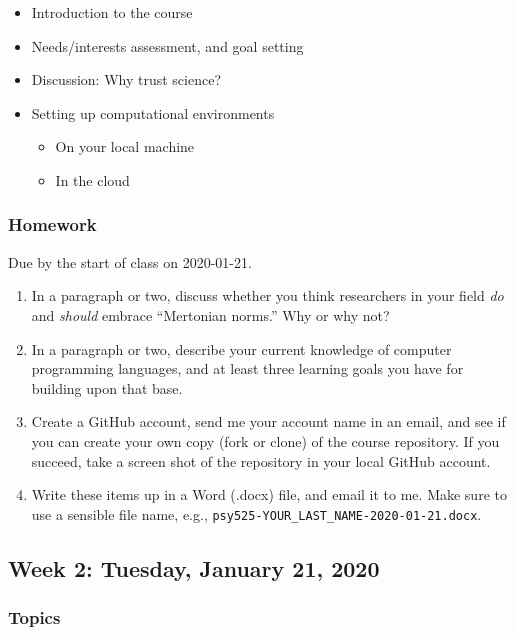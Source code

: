 \documentclass[
]{article}
\providecommand{\tightlist}{%
  \setlength{\itemsep}{0pt}\setlength{\parskip}{0pt}}
\begin{document}
\begin{itemize}
\tightlist
\item
  Introduction to the course
\item
  Needs/interests assessment, and goal setting
\item
  Discussion: Why trust science?
\item
  Setting up computational environments

  \begin{itemize}
  \tightlist
  \item
    On your local machine
  \item
    In the cloud
  \end{itemize}
\end{itemize}

\hypertarget{homework}{%
\subsubsection{Homework}\label{homework}}

Due by the start of class on 2020-01-21.

\begin{enumerate}
\def\labelenumi{\arabic{enumi}.}
\tightlist
\item
  In a paragraph or two, discuss whether you think researchers in your
  field \emph{do} and \emph{should} embrace ``Mertonian norms.'' Why or
  why not?
\item
  In a paragraph or two, describe your current knowledge of computer
  programming languages, and at least three learning goals you have for
  building upon that base.
\item
  Create a GitHub account, send me your account name in an email, and
  see if you can create your own copy (fork or clone) of the course
  repository. If you succeed, take a screen shot of the repository in
  your local GitHub account.
\item
  Write these items up in a Word (.docx) file, and email it to me. Make
  sure to use a sensible file name, e.g.,
  \texttt{psy525-YOUR\_LAST\_NAME-2020-01-21.docx}.
\end{enumerate}

\hypertarget{week-2-tuesday-january-21-2020}{%
\subsection{Week 2: Tuesday, January 21,
2020}\label{week-2-tuesday-january-21-2020}}

\hypertarget{topics-1}{%
\subsubsection{Topics}\label{topics-1}}
\end{document}

